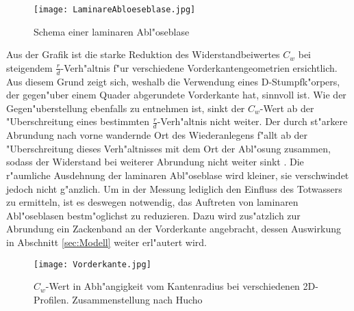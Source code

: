 \begin{figure}[h]
	\centering
	\texttt{[image: LaminareAbloeseblase.jpg]}
	\caption{Schema einer laminaren Abl"oseblase \cite{Siegman.2015}}
	\label{fig:LamBlase}
\end{figure}

Aus der Grafik  ist die starke Reduktion des Widerstandbeiwertes $C_w$ bei steigendem $\frac{r}{d}$-Verh"altnis f"ur verschiedene Vorderkantengeometrien ersichtlich. Aus diesem Grund zeigt sich, weshalb die Verwendung eines D-Stumpfk"orpers, der gegen"uber einem Quader abgerundete Vorderkante hat, sinnvoll ist. Wie der Gegen"uberstellung  ebenfalls zu entnehmen ist, sinkt der $C_w$-Wert ab der "Uberschreitung eines bestimmten $\frac{r}{d}$-Verh"altnis nicht weiter. Der durch st"arkere Abrundung nach vorne wandernde Ort des Wiederanlegens f"allt ab der "Uberschreitung dieses Verh"altnisses mit dem Ort der Abl"osung zusammen, sodass der Widerstand bei weiterer Abrundung nicht weiter sinkt \cite{Hucho.2011}. Die r"aumliche Ausdehnung der laminaren Abl"oseblase wird kleiner, sie verschwindet jedoch nicht g"anzlich. Um in der Messung lediglich den Einfluss des Totwassers zu ermitteln, ist es deswegen notwendig, das Auftreten von laminaren Abl"oseblasen bestm"oglichst zu reduzieren. Dazu wird zus"atzlich zur Abrundung ein Zackenband an der Vorderkante angebracht, dessen Auswirkung in Abschnitt \ref{sec:Modell} weiter erl"autert wird.

\begin{figure}[h]
	\centering	\texttt{[image: Vorderkante.jpg]}
	\caption{$C_w$-Wert in Abh"angigkeit vom Kantenradius bei verschiedenen 2D-Profilen. Zusammenstellung nach Hucho\cite{Hucho.1972}}
	\label{fig:Vorderkante}
\end{figure}








